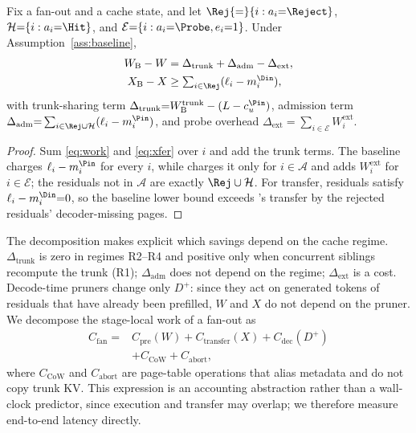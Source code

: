 \begin{proposition}[Accounting]
\label{prop:acct}
Fix a fan-out and a cache state, and let $\Rej{=}\{i:a_i{=}\Reject\}$, $\mathcal{H}{=}\{i:a_i{=}\Hit\}$, and $\mathcal{E}{=}\{i:a_i{=}\Probe,e_i{=}1\}$.
Under Assumption~\ref{ass:baseline},
\begin{align}
W_{\mathrm{B}}-W &= \Delta_{\mathrm{trunk}}+\Delta_{\mathrm{adm}}-\Delta_{\mathrm{ext}}, \label{eq:acct}\\
X_{\mathrm{B}}-X &\ge \textstyle\sum_{i\in\Rej}(\ell_i-m_i^{\Din}), \nonumber
\end{align}
with trunk-sharing term $\Delta_{\mathrm{trunk}}{=}W_{\mathrm{B}}^{\mathrm{trunk}}-(L-c_u^{\Pin})$, admission term $\Delta_{\mathrm{adm}}{=}\sum_{i\in\Rej\cup\mathcal{H}}(\ell_i-m_i^{\Pin})$, and probe overhead $\Delta_{\mathrm{ext}}{=}\sum_{i\in\mathcal{E}}W_i^{\mathrm{ext}}$.
\end{proposition}

\begin{proof}
Sum \eqref{eq:work} and \eqref{eq:xfer} over $i$ and add the trunk terms.
The baseline charges $\ell_i-m_i^{\Pin}$ for every $i$, while \sys charges it only for $i\in\mathcal{A}$ and adds $W_i^{\mathrm{ext}}$ for $i\in\mathcal{E}$; the residuals not in $\mathcal{A}$ are exactly $\Rej\cup\mathcal{H}$.
For transfer, \Hit residuals satisfy $\ell_i-m_i^{\Din}{=}0$, so the baseline lower bound exceeds \sys's transfer by the rejected residuals' decoder-missing pages.
\end{proof}

The decomposition makes explicit which savings depend on the cache regime.
$\Delta_{\mathrm{trunk}}$ is zero in regimes R2--R4 and positive only when concurrent siblings recompute the trunk (R1); $\Delta_{\mathrm{adm}}$ does not depend on the regime; $\Delta_{\mathrm{ext}}$ is a cost.
Decode-time pruners change only $D^{+}$: since they act on generated tokens of residuals that have already been prefilled, $W$ and $X$ do not depend on the pruner.
We decompose the stage-local work of a fan-out as
\begin{equation}
\label{eq:tfan}
\begin{aligned}
C_{\mathrm{fan}}={}&C_{\mathrm{pre}}(W)+C_{\mathrm{transfer}}(X)+C_{\mathrm{dec}}(D^{+})\\
&+C_{\mathrm{CoW}}+C_{\mathrm{abort}},
\end{aligned}
\end{equation}
where $C_{\mathrm{CoW}}$ and $C_{\mathrm{abort}}$ are page-table operations that alias metadata and do not copy trunk KV.
This expression is an accounting abstraction rather than a wall-clock predictor, since execution and transfer may overlap; we therefore measure end-to-end latency directly.

